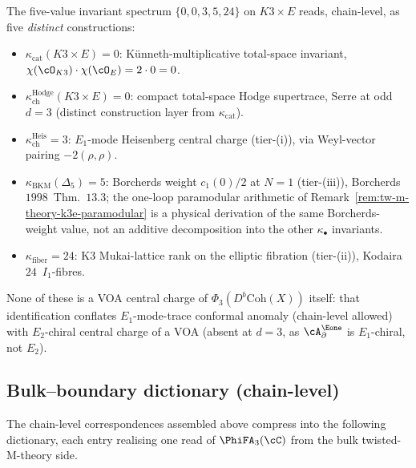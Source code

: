 \begin{remark}
\label{rem:four-kappa-spectrum-twisted-M}
The five-value invariant spectrum $\{0, 0, 3, 5, 24\}$ on $K3 \times E$
reads, chain-level, as five \emph{distinct} constructions:
\begin{itemize}
\item $\kappa_{\mathrm{cat}}(K3 \times E) = 0$: K\"unneth-multiplicative
total-space invariant, $\chi(\cO_{K3}) \cdot \chi(\cO_E) = 2 \cdot 0 = 0$.
\item $\kappa_{\mathrm{ch}}^{\mathrm{Hodge}}(K3 \times E) = 0$: compact
total-space Hodge supertrace, Serre at odd $d = 3$ (distinct
construction layer from $\kappa_{\mathrm{cat}}$).
\item $\kappa_{\mathrm{ch}}^{\mathrm{Heis}} = 3$: $E_1$-mode Heisenberg
central charge (tier-\textup{(i)}), via Weyl-vector pairing
$-2(\rho, \rho)$.
\item $\kappa_{\mathrm{BKM}}(\Delta_5) = 5$: Borcherds weight
$c_1(0)/2$ at $N = 1$ (tier-\textup{(iii)}), Borcherds $1998$~Thm.~$13.3$;
the one-loop paramodular arithmetic of
Remark~\ref{rem:tw-m-theory-k3e-paramodular} is a physical derivation of the same
Borcherds-weight value, not an additive decomposition into the other
$\kappa_\bullet$ invariants.
\item $\kappa_{\mathrm{fiber}} = 24$: K3 Mukai-lattice rank on the
elliptic fibration (tier-\textup{(ii)}), Kodaira $24$~$I_1$-fibres.
\end{itemize}
None of these is a VOA central charge of $\Phi_3(D^b\mathrm{Coh}(X))$
itself: that identification conflates $E_1$-mode-trace conformal
anomaly (chain-level allowed) with $E_2$-chiral central charge of a
VOA (absent at $d = 3$, as $\cA^{\Eone}_\partial$ is $E_1$-chiral, not
$E_2$).
\end{remark}

\subsection{Bulk--boundary dictionary (chain-level)}
\label{subsec:bulk-boundary-dictionary-chain-level}

The chain-level correspondences assembled above compress into the
following dictionary, each entry realising one read of $\PhiFA_3(\cC)$
from the bulk twisted-M-theory side.

